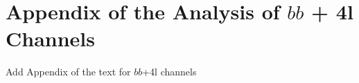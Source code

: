 \section{Appendix of the Analysis of $bb$ + 4l Channels }
\label{sec:Appbb4l}
Add Appendix of the text for $bb$+4l channels



